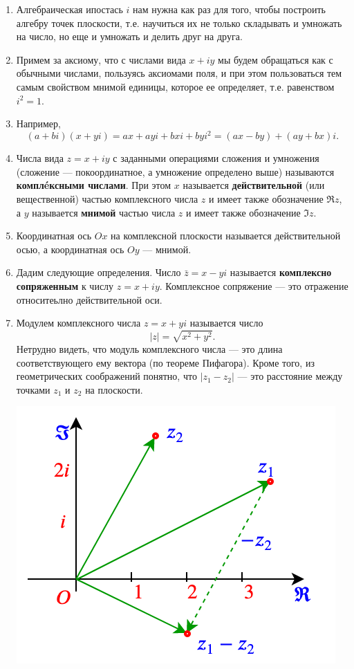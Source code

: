 \begin{enumerate}
\item Алгебраическая ипостась $i$ нам нужна как раз для того, чтобы построить алгебру точек плоскости, т.е. научиться их не только складывать и умножать на число, но еще и умножать и делить друг на друга.
\item Примем за аксиому, что с числами вида $x+iy$ мы будем обращаться как с обычными числами, пользуясь аксиомами поля, и при этом пользоваться тем самым свойством мнимой единицы, которое ее определяет, т.е. равенством $i^2=1$.
\item Например,
$$
(a+bi)(x+yi) = ax + ayi + bxi + byi^2 = (ax-by) + (ay+bx)i.
$$
\item Числа вида $z=x+iy$ с заданными операциями сложения и умножения (сложение --- покоординатное, а умножение определено выше) называются \textbf{компл\'eксными числами}. При этом $x$ называется \textbf{действительной} (или вещественной) частью комплексного числа $z$ и имеет также обозначение $\Re z$, а $y$ называется \textbf{мнимой} частью числа $z$ и имеет также обозначение $\Im z$.
\item Координатная ось $Ox$ на комплексной плоскости называется действительной осью, а координатная ось $Oy$ --- мнимой.
\item Дадим следующие определения. Число $\bar z=x-yi$ называется \textbf{комплексно сопряженным} к числу $z=x+iy$. Комплексное сопряжение --- это отражение относитеьлно действительной оси.
\item Модулем комплексного числа $z=x+yi$ называется число $$|z|=\sqrt{x^2+y^2}.$$
Нетрудно видеть, что модуль комплексного числа --- это длина соответствующего ему вектора (по теореме Пифагора). Кроме того, из геометрических соображений понятно, что $|z_1-z_2|$ --- это расстояние между точками $z_1$ и $z_2$ на плоскости.
\begin{center}
\includegraphics[scale=0.5]{rho.png}

\end{center}
\end{enumerate}
